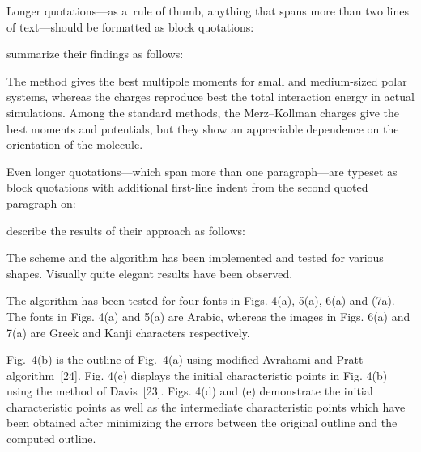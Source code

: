 \documentclass[11pt, a4paper, oneside]{article}
\newlength{\baselinedist}
\newlength{\smalllinespacing}
\renewenvironment{quote}{%
	\par\list{}{%
		\baselineskip = \smalllinespacing%
		\leftmargin = \baselineskip%
		\rightmargin = \leftmargin%
		\topsep = 0.5\baselinedist plus 3ex
	}
	\item\relax%
}{%
	\endlist%
}
\renewenvironment{quotation}{%
	\list{}{%
		\baselineskip = \smalllinespacing%
		\leftmargin = \baselineskip%
		\rightmargin = \leftmargin%
		\listparindent = \smalllinespacing%
		\parsep = 0pt%
		\topsep = 0.5\baselinedist plus 3ex
	}%
	\item\relax%
}{%
	\endlist%
}
\renewcommand{\caps}[1]{{\textscale{0.97}{\textls[50]{\MakeUppercase{#1}}}}}
\theoremstyle{Plain}
\theoremstyle{Definition}
\theoremstyle{Remark}
\let \cite \textcite
\begin{document}
Longer quotations---as a~rule of thumb, anything that spans more than two lines of text---should be formatted as block quotations:
\begin{longtblr}{}
	\begin{minipage}{\linewidth}%
		\strut\noindent%
		\cite[377]{sigfridsson} summarize their findings as follows:
		\begin{quote}\vspace{-\smallskipamount}%
			The \caps{CHELMO} method gives the best multipole moments for small and medium-sized polar systems, whereas the \caps{CHELP-BOW} charges reproduce best the total interaction energy in actual simulations. Among the standard methods, the Merz--Kollman charges give the best moments and potentials, but they show an appreciable dependence on the orientation of the molecule.%
			\strut
		\end{quote}
	\end{minipage}
\end{longtblr}
\noindent Even longer quotations---which span more than one paragraph---are typeset as block quotations with additional first-line indent from the second quoted paragraph on:
\begin{longtblr}{}
	\begin{minipage}{\linewidth}
		\strut\noindent%
		\cite[801]{sarfraz} describe the results of their approach as follows:
		\begin{quotation}\vspace{-\smallskipamount}%
			The scheme and the algorithm has been implemented and tested for various shapes. Visually quite elegant results have been observed. \par
			The algorithm has been tested for four fonts in Figs. 4(a), 5(a), 6(a) and (7a). The fonts in Figs. 4(a) and 5(a) are Arabic, whereas the images in Figs. 6(a) and 7(a) are Greek and Kanji characters respectively. \par
			Fig.~4(b) is the outline of Fig.~4(a) using modified Avrahami and Pratt algorithm~[24]. Fig. 4(c) displays the initial characteristic points in Fig. 4(b) using the method of Davis~[23]. Figs. 4(d) and (e) demonstrate the initial characteristic points as well as the intermediate characteristic points which have been obtained after minimizing the errors between the original outline and the computed outline.%
			\strut
		\end{quotation}
	\end{minipage}
\end{longtblr}
\end{document}
